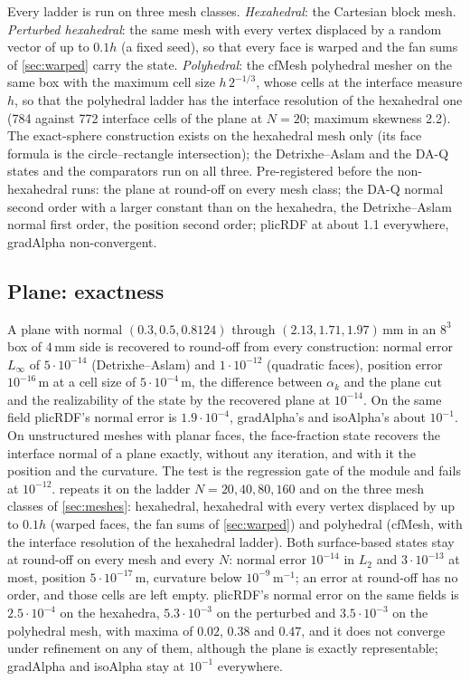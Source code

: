 \documentclass[preprint,12pt]{elsarticle}
\begin{document}
\label{sec:meshes}Every ladder is run on three mesh classes. \emph{Hexahedral}: the Cartesian block mesh. \emph{Perturbed hexahedral}: the same mesh with every vertex displaced by a random vector of up to $0.1h$ (a fixed seed), so that every face is warped and the fan sums of \cref{sec:warped} carry the state. \emph{Polyhedral}: the cfMesh polyhedral mesher on the same box with the maximum cell size $h\,2^{-1/3}$, whose cells at the interface measure $h$, so that the polyhedral ladder has the interface resolution of the hexahedral one (784 against 772 interface cells of the plane at $N = 20$; maximum skewness 2.2). The exact-sphere construction exists on the hexahedral mesh only (its face formula is the circle--rectangle intersection); the Detrixhe--Aslam and the DA-Q states and the comparators run on all three. Pre-registered before the non-hexahedral runs: the plane at round-off on every mesh class; the DA-Q normal second order with a larger constant than on the hexahedra, the Detrixhe--Aslam normal first order, the position second order; plicRDF at about 1.1 everywhere, gradAlpha non-convergent.

\subsection{Plane: exactness}
\label{sec:plane}

A plane with normal $(0.3, 0.5, 0.8124)$ through $(2.13, 1.71, 1.97)\,\mathrm{mm}$ in an $8^3$ box of $4\,\mathrm{mm}$ side is recovered to round-off from every construction: normal error $L_\infty$ of $5\cdot10^{-14}$ (Detrixhe--Aslam) and $1\cdot10^{-12}$ (quadratic faces), position error $10^{-16}\,\mathrm{m}$ at a cell size of $5\cdot10^{-4}\,\mathrm{m}$, the difference between $\alpha_k$ and the plane cut and the realizability of the state by the recovered plane at $10^{-14}$. On the same field plicRDF's normal error is $1.9\cdot10^{-4}$, gradAlpha's and isoAlpha's about $10^{-1}$. On unstructured meshes with planar faces, the face-fraction state recovers the interface normal of a plane exactly, without any iteration, and with it the position and the curvature. The test is the regression gate of the module \citep{LeiaRepo2026} and fails at $10^{-12}$.  repeats it on the ladder $N = 20, 40, 80, 160$ and on the three mesh classes of \cref{sec:meshes}: hexahedral, hexahedral with every vertex displaced by up to $0.1h$ (warped faces, the fan sums of \cref{sec:warped}) and polyhedral (cfMesh, with the interface resolution of the hexahedral ladder). Both surface-based states stay at round-off on every mesh and every $N$: normal error $10^{-14}$ in $L_2$ and $3\cdot10^{-13}$ at most, position $5\cdot10^{-17}\,\mathrm{m}$, curvature below $10^{-9}\,\mathrm{m^{-1}}$; an error at round-off has no order, and those cells are left empty. plicRDF's normal error on the same fields is $2.5\cdot10^{-4}$ on the hexahedra, $5.3\cdot10^{-3}$ on the perturbed and $3.5\cdot10^{-3}$ on the polyhedral mesh, with maxima of $0.02$, $0.38$ and $0.47$, and it does not converge under refinement on any of them, although the plane is exactly representable; gradAlpha and isoAlpha stay at $10^{-1}$ everywhere.
\end{document}
